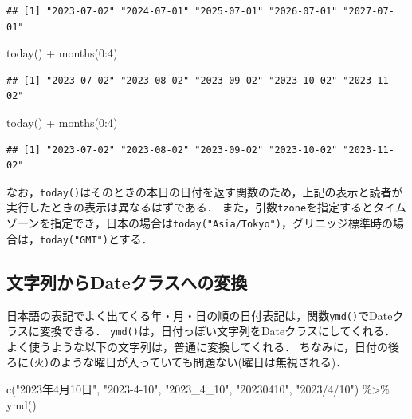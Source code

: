 \documentclass[
]{article}
\newenvironment{Shaded}{\begin{snugshade}}{\end{snugshade}}
\newcommand{\DecValTok}[1]{\textcolor[rgb]{0.00,0.00,0.81}{#1}}
\newcommand{\FunctionTok}[1]{\textcolor[rgb]{0.00,0.00,0.00}{#1}}
\newcommand{\NormalTok}[1]{#1}
\newcommand{\SpecialCharTok}[1]{\textcolor[rgb]{0.00,0.00,0.00}{#1}}
\newcommand{\StringTok}[1]{\textcolor[rgb]{0.31,0.60,0.02}{#1}}
\begin{document}
\begin{verbatim}
## [1] "2023-07-02" "2024-07-01" "2025-07-01" "2026-07-01" "2027-07-01"
\end{verbatim}

\begin{Shaded}
\begin{Highlighting}[]
\FunctionTok{today}\NormalTok{() }\SpecialCharTok{+} \FunctionTok{months}\NormalTok{(}\DecValTok{0}\SpecialCharTok{:}\DecValTok{4}\NormalTok{)}
\end{Highlighting}
\end{Shaded}

\begin{verbatim}
## [1] "2023-07-02" "2023-08-02" "2023-09-02" "2023-10-02" "2023-11-02"
\end{verbatim}

\begin{Shaded}
\begin{Highlighting}[]
\FunctionTok{today}\NormalTok{() }\SpecialCharTok{+} \FunctionTok{months}\NormalTok{(}\DecValTok{0}\SpecialCharTok{:}\DecValTok{4}\NormalTok{)}
\end{Highlighting}
\end{Shaded}

\begin{verbatim}
## [1] "2023-07-02" "2023-08-02" "2023-09-02" "2023-10-02" "2023-11-02"
\end{verbatim}

なお，\texttt{today()}はそのときの本日の日付を返す関数のため，上記の表示と読者が実行したときの表示は異なるはずである．
また，引数\texttt{tzone}を指定するとタイムゾーンを指定でき，日本の場合は\texttt{today("Asia/Tokyo")}，グリニッジ標準時の場合は，\texttt{today("GMT")}とする．

\hypertarget{ux6587ux5b57ux5217ux304bux3089dateux30afux30e9ux30b9ux3078ux306eux5909ux63db}{%
\subsection{文字列からDateクラスへの変換}\label{ux6587ux5b57ux5217ux304bux3089dateux30afux30e9ux30b9ux3078ux306eux5909ux63db}}

日本語の表記でよく出てくる年・月・日の順の日付表記は，関数\texttt{ymd()}でDateクラスに変換できる．
\texttt{ymd()}は，日付っぽい文字列をDateクラスにしてくれる．
よく使うような以下の文字列は，普通に変換してくれる．
ちなみに，日付の後ろに\texttt{(火)}のような曜日が入っていても問題ない(曜日は無視される)．

\begin{Shaded}
\begin{Highlighting}[]
\FunctionTok{c}\NormalTok{(}\StringTok{"2023年4月10日"}\NormalTok{, }\StringTok{"2023{-}4{-}10"}\NormalTok{, }\StringTok{"2023\_4\_10"}\NormalTok{, }\StringTok{"20230410"}\NormalTok{, }\StringTok{"2023/4/10"}\NormalTok{) }\SpecialCharTok{\%\textgreater{}\%}
  \FunctionTok{ymd}\NormalTok{()}
\end{Highlighting}
\end{Shaded}
\end{document}
